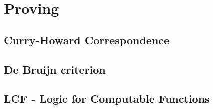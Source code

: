 \chapter{Proving}

\section{Curry-Howard Correspondence}
\section{De Bruijn criterion}
\section{LCF - Logic for Computable Functions}